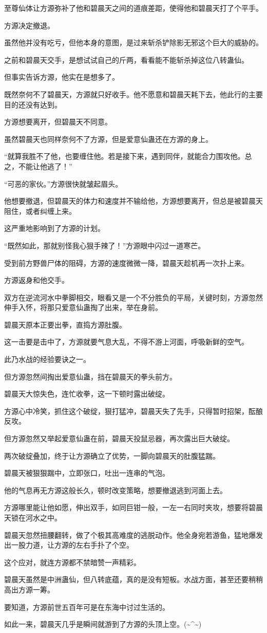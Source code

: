 \begin{this_body}
至尊仙体让方源弥补了他和碧晨天之间的道痕差距，使得他和碧晨天打了个平手。

方源决定撤退。

虽然他并没有吃亏，但他本身的意图，是过来斩杀铲除影无邪这个巨大的威胁的。

之前和碧晨天交手，是想试试自己的斤两，看看能不能斩杀掉这位八转蛊仙。

但事实告诉方源，他实在是想多了。

既然奈何不了碧晨天，方源就只好收手。他不愿意和碧晨天耗下去，他此行的主要目的还没有达到。

方源想要离开，但碧晨天不同意。

虽然碧晨天也同样奈何不了方源，但是爱意仙蛊还在方源的身上。

“就算我胜不了他，也要缠住他。若是接下来，遇到同伴，就能合力围攻他。总之，不能让他逃了！”

“可恶的家伙。”方源很快就皱起眉头。

他想要撤退，但碧晨天的体力和速度并不输给他，方源想要离开，但总是被碧晨天阻住，或者纠缠上来。

这严重地影响到了方源的计划。

“既然如此，那就别怪我心狠手辣了！”方源眼中闪过一道寒芒。

受到前方野兽尸体的阻碍，方源的速度微微一降，碧晨天趁机再一次扑上来。

方源返身和他交手。

双方在逆流河水中拳脚相交，眼看又是一个不分胜负的平局，关键时刻，方源忽然伸手入怀，将那只爱意仙蛊掏了出来，举在身前。

碧晨天原本正要出拳，直捣方源肚腹。

这一击要是击中了，方源就要气息大乱，不得不游上河面，呼吸新鲜的空气。

此乃水战的经验要诀之一。

但方源忽然间掏出爱意仙蛊，挡在碧晨天的拳头前方。

碧晨天大惊失色，连忙收拳，这一下顿时露出破绽。

方源心中冷笑，抓住这个破绽，狠打猛冲，碧晨天失了先手，只得暂时招架，酝酿反攻。

但方源忽然又举起爱意仙蛊在前，碧晨天投鼠忌器，再次露出巨大破绽。

两次破绽叠加，终于让方源确立了优势，一脚向碧晨天的肚腹猛踹。

碧晨天被狠狠踹中，立即张口，吐出一连串的气泡。

他的气息再无方源这般长久，顿时改变策略，想要撤退逃到河面上去。

方源哪里能让他如愿，伸出双手，如同巨钳一般，一左一右同时夹攻，想要将碧晨天锁在河水之中。

碧晨天忽然扭腰翻转，做了个极其高难度的逃脱动作。他全身宛若游鱼，猛地爆发出一股力道，让方源的左右手扑了个空。

这个应对，就连方源都不禁暗赞一声精彩。

碧晨天虽然是中洲蛊仙，但八转底蕴，真的是没有短板。水战方面，甚至还要稍稍高出方源一筹。

要知道，方源前世五百年可是在东海中讨过生活的。

如此一来，碧晨天几乎是瞬间就游到了方源的头顶上空。(\~{}\^{}\~{})

\end{this_body}

